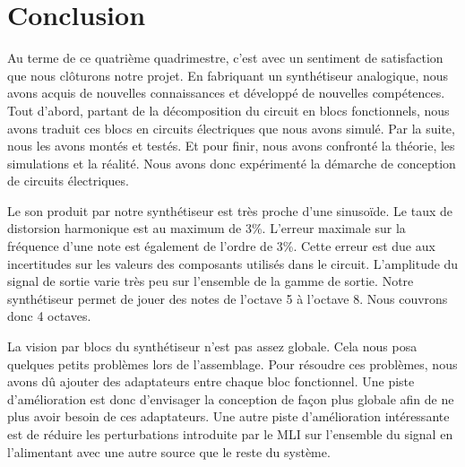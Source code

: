 \chapter{Conclusion}
Au terme de ce quatrième quadrimestre, c'est avec un sentiment de satisfaction
que nous clôturons notre projet. En fabriquant un synthétiseur analogique,
nous avons acquis de nouvelles connaissances et développé de nouvelles compétences.
Tout d'abord, partant de la décomposition du circuit en blocs fonctionnels,
nous avons traduit ces blocs en circuits électriques que nous avons simulé.
Par la suite, nous les avons montés et testés. Et pour finir, nous avons confronté
la théorie, les simulations et la réalité. Nous avons donc expérimenté la démarche de
conception de circuits électriques.

Le son produit par notre synthétiseur est très proche d'une sinusoïde. Le taux de
distorsion harmonique est au maximum de 3\%. L'erreur maximale sur la fréquence
d'une note est également de l'ordre de 3\%. Cette erreur est due aux incertitudes sur les
valeurs des composants utilisés dans le circuit.
L'amplitude du signal de sortie varie très peu sur l'ensemble de la gamme de sortie.
Notre synthétiseur permet de jouer des notes de l'octave 5 à l'octave 8. 
Nous couvrons donc 4 octaves.

La vision par blocs du synthétiseur n'est pas assez globale. Cela nous posa
quelques petits problèmes lors de l'assemblage. Pour résoudre ces problèmes, 
nous avons dû ajouter des adaptateurs entre chaque bloc fonctionnel. Une piste
d'amélioration est donc d'envisager la conception de façon plus globale afin
de ne plus avoir besoin de ces adaptateurs. Une autre piste d'amélioration intéressante
est de réduire les perturbations introduite par le MLI sur l'ensemble du signal en 
l'alimentant avec une autre source que le reste du système.